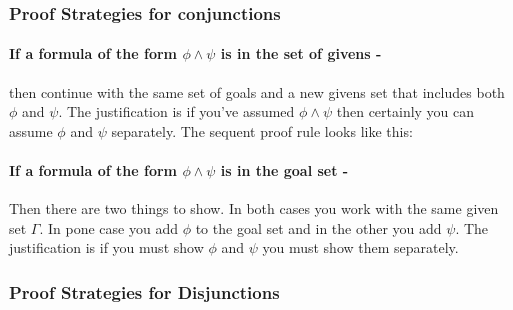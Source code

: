 \documentclass[11pt]{article}
\newcommand{\rbreak}{\ \\}
\newcommand{\NamedSequentRule}[3]{{\mbox{{\begin{tabular}{c} {\mbox{$#1$}}\vspace{.25em}\\ \hline \vspace{.25em} {\mbox{$#2$}} \end{tabular}}{\hspace{.5em}{#3}}}}}
\begin{document}
\subsubsection{Proof Strategies for conjunctions}

\paragraph{If a formula of the form $\phi\wedge\psi$ is in the set of givens -
} then continue with the same set of goals and a new givens set that includes
both $\phi$ and $\psi$. The justification is if you've assumed $\phi\wedge\psi$
then certainly you can assume $\phi$ and $\psi$ separately.  The sequent proof rule looks like this:

\paragraph{If a formula of the form $\phi\wedge\psi$ is in the goal set -} Then
there are two things to show.  In both cases you work with the same given set
$\Gamma$. In pone case you add $\phi$ to the goal set and in the other you add
$\psi$. The justification is if you must show $\phi$ and $\psi$ you must show
them separately.




\subsubsection{Proof Strategies for Disjunctions}
\end{document}
